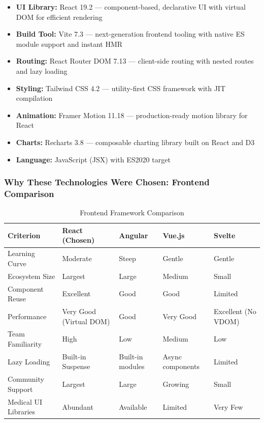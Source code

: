 \documentclass[12pt]{article}
\begin{document}
	\begin{itemize}
		\item \textbf{UI Library:} React 19.2 --- component-based, declarative UI with virtual DOM for efficient rendering
		\item \textbf{Build Tool:} Vite 7.3 --- next-generation frontend tooling with native ES module support and instant HMR
		\item \textbf{Routing:} React Router DOM 7.13 --- client-side routing with nested routes and lazy loading
		\item \textbf{Styling:} Tailwind CSS 4.2 --- utility-first CSS framework with JIT compilation
		\item \textbf{Animation:} Framer Motion 11.18 --- production-ready motion library for React
		\item \textbf{Charts:} Recharts 3.8 --- composable charting library built on React and D3
		\item \textbf{Language:} JavaScript (JSX) with ES2020 target
	\end{itemize}

	\subsubsection{Why These Technologies Were Chosen: Frontend Comparison}

	\begin{table}[H]
		\centering
		\caption{Frontend Framework Comparison}
		\small
		\begin{tabular}{|p{2.2cm}|p{2.2cm}|p{2.2cm}|p{2.2cm}|p{2.2cm}|}
			\hline
			\textbf{Criterion} & \textbf{React (Chosen)} & \textbf{Angular} & \textbf{Vue.js} & \textbf{Svelte} \\ \hline
			Learning Curve & Moderate & Steep & Gentle & Gentle \\ \hline
			Ecosystem Size & Largest & Large & Medium & Small \\ \hline
			Component Reuse & Excellent & Good & Good & Limited \\ \hline
			Performance & Very Good (Virtual DOM) & Good & Very Good & Excellent (No VDOM) \\ \hline
			Team Familiarity & High & Low & Medium & Low \\ \hline
			Lazy Loading & Built-in Suspense & Built-in modules & Async components & Limited \\ \hline
			Community Support & Largest & Large & Growing & Small \\ \hline
			Medical UI Libraries & Abundant & Available & Limited & Very Few \\ \hline
		\end{tabular}
	\end{table}
\end{document}
